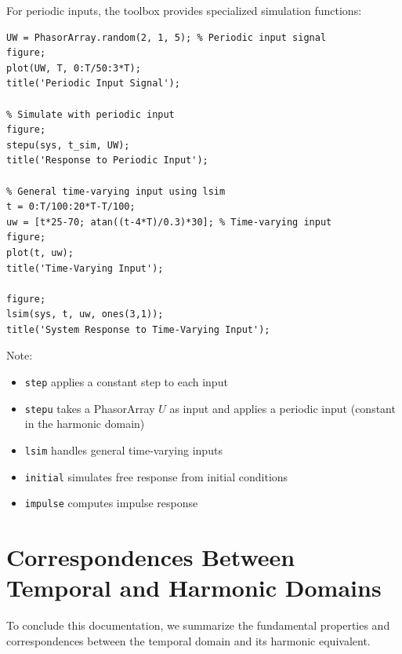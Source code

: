 \documentclass[11pt,a4paper]{article}
\begin{document}
For periodic inputs, the toolbox provides specialized simulation functions:

\begin{lstlisting}[style=matlabstyle]
% Periodic step input (constant in harmonic domain)
UW = PhasorArray.random(2, 1, 5); % Periodic input signal
figure;
plot(UW, T, 0:T/50:3*T);
title('Periodic Input Signal');

% Simulate with periodic input
figure;
stepu(sys, t_sim, UW);
title('Response to Periodic Input');

% General time-varying input using lsim
t = 0:T/100:20*T-T/100;
uw = [t*25-70; atan((t-4*T)/0.3)*30]; % Time-varying input
figure;
plot(t, uw);
title('Time-Varying Input');

figure;
lsim(sys, t, uw, ones(3,1));
title('System Response to Time-Varying Input');
\end{lstlisting}

Note:
\begin{itemize}
    \item \texttt{step} applies a constant step to each input
    \item \texttt{stepu} takes a PhasorArray $U$ as input and applies a periodic input (constant in the harmonic domain)
    \item \texttt{lsim} handles general time-varying inputs
    \item \texttt{initial} simulates free response from initial conditions
    \item \texttt{impulse} computes impulse response
\end{itemize}

\section{Correspondences Between Temporal and Harmonic Domains}

To conclude this documentation, we summarize the fundamental properties and correspondences between the temporal domain and its harmonic equivalent.
\end{document}
